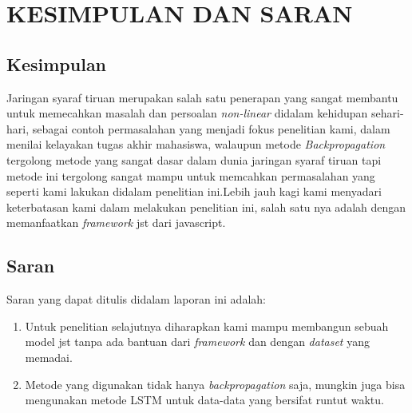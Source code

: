 
\chapter{KESIMPULAN DAN SARAN}                

\section{Kesimpulan}
  Jaringan syaraf tiruan merupakan salah satu penerapan yang sangat membantu untuk memecahkan masalah dan persoalan \emph{non-linear} didalam kehidupan sehari-hari, sebagai contoh permasalahan yang menjadi fokus penelitian kami, dalam menilai kelayakan tugas akhir mahasiswa, walaupun metode \emph{Backpropagation} tergolong metode yang sangat dasar dalam dunia jaringan syaraf tiruan tapi metode ini tergolong sangat mampu untuk memcahkan permasalahan yang seperti kami lakukan didalam penelitian ini.Lebih jauh kagi kami menyadari keterbatasan kami dalam melakukan penelitian ini, salah satu nya adalah dengan memanfaatkan \emph{framework} jst dari javascript. 

\section{Saran}
Saran yang dapat ditulis didalam laporan ini adalah:
\begin{enumerate}
	\item Untuk penelitian selajutnya diharapkan kami mampu membangun sebuah model jst tanpa ada bantuan dari \emph{framework} dan dengan \emph{dataset} yang memadai.
	\item Metode yang digunakan tidak hanya \emph{backpropagation} saja, mungkin juga bisa mengunakan metode LSTM untuk data-data yang bersifat runtut waktu. 
\end{enumerate}
\begin{comment}

\end{comment}
